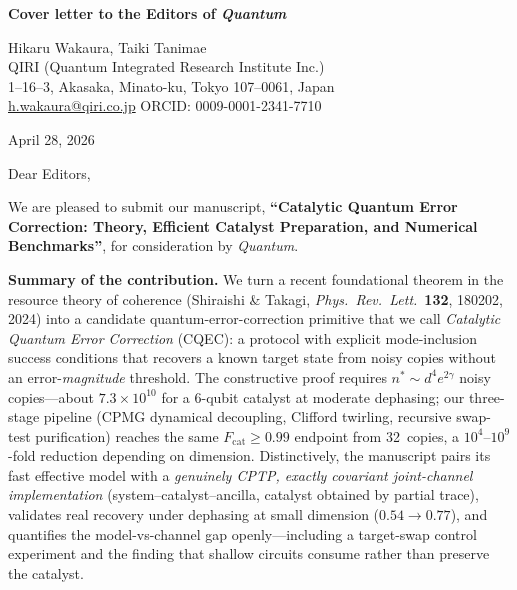 \documentclass[11pt,a4paper]{article}
\begin{document}
\textbf{Cover letter to the Editors of \emph{Quantum}}

\vspace{0.4cm}

Hikaru Wakaura, Taiki Tanimae \\
QIRI (Quantum Integrated Research Institute Inc.)\\
1--16--3, Akasaka, Minato-ku, Tokyo 107--0061, Japan\\
\href{mailto:h.wakaura@qiri.co.jp}{h.wakaura@qiri.co.jp} \quad ORCID: 0009-0001-2341-7710

\vspace{0.3cm}
April 28, 2026

\vspace{0.4cm}

Dear Editors,

\medskip

We are pleased to submit our manuscript, \textbf{``Catalytic Quantum Error Correction: Theory, Efficient Catalyst Preparation, and Numerical Benchmarks''}, for consideration by \emph{Quantum}.

\medskip

\textbf{Summary of the contribution.}
We turn a recent foundational theorem in the resource theory of coherence (Shiraishi \& Takagi, \emph{Phys.\ Rev.\ Lett.}\ \textbf{132}, 180202, 2024) into a candidate quantum-error-correction primitive that we call \emph{Catalytic Quantum Error Correction} (CQEC): a protocol with explicit mode-inclusion success conditions that recovers a known target state from noisy copies without an error-\emph{magnitude} threshold.
The constructive proof requires $n^{*} \sim d^{4} e^{2\gamma}$ noisy copies---about $7.3 \times 10^{10}$ for a 6-qubit catalyst at moderate dephasing; our three-stage pipeline (CPMG dynamical decoupling, Clifford twirling, recursive swap-test purification) reaches the same $F_\mathrm{cat} \geq 0.99$ endpoint from 32~copies, a $10^{4}$--$10^{9}$-fold reduction depending on dimension.
Distinctively, the manuscript pairs its fast effective model with a \emph{genuinely CPTP, exactly covariant joint-channel implementation} (system--catalyst--ancilla, catalyst obtained by partial trace), validates real recovery under dephasing at small dimension ($0.54 \to 0.77$), and quantifies the model-vs-channel gap openly---including a target-swap control experiment and the finding that shallow circuits consume rather than preserve the catalyst.

\medskip
\end{document}
